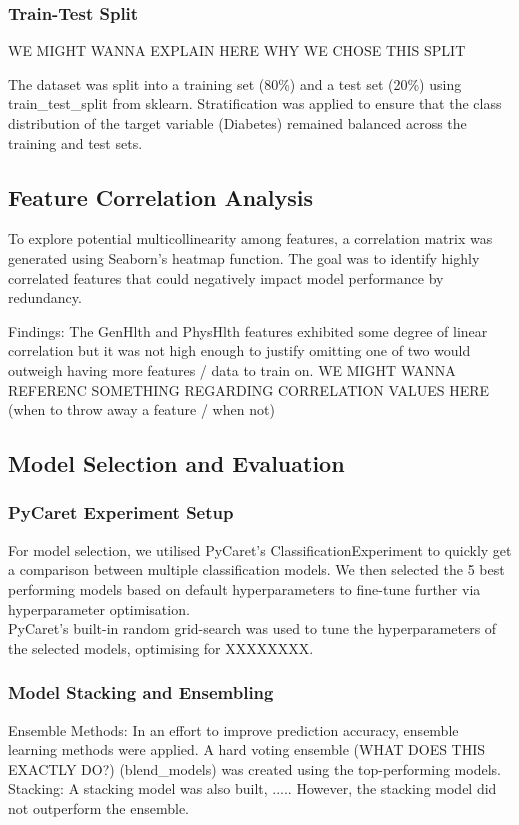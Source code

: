 \documentclass[a4paper,12pt]{article}
\begin{document}
\subsubsection{Train-Test Split}
WE MIGHT WANNA EXPLAIN HERE WHY WE CHOSE THIS SPLIT

The dataset was split into a training set (80\%) and a test set (20\%) using train\_test\_split from 
sklearn. Stratification was applied to ensure that the class distribution of the target variable 
(Diabetes) remained balanced across the training and test sets.

\subsection{Feature Correlation Analysis}
To explore potential multicollinearity among features, a correlation matrix was generated using 
Seaborn's heatmap function. The goal was to identify highly correlated features that could negatively 
impact model performance by redundancy.

Findings: The GenHlth and PhysHlth features exhibited some degree of linear correlation but it was
not high enough to justify omitting one of two would outweigh having more features / data to train 
on.
WE MIGHT WANNA REFERENC SOMETHING REGARDING CORRELATION VALUES HERE 
(when to throw away a feature / when not)

\subsection{Model Selection and Evaluation}
\subsubsection{PyCaret Experiment Setup}
For model selection, we utilised PyCaret's ClassificationExperiment to quickly get a 
comparison between multiple classification models. We then selected the 
5 best performing models based on default hyperparameters to fine-tune further via hyperparameter
optimisation.
\\
PyCaret’s built-in random grid-search was used to tune the hyperparameters of the selected models, 
optimising for XXXXXXXX.

\subsubsection{Model Stacking and Ensembling}
Ensemble Methods: In an effort to improve prediction accuracy, ensemble learning methods were applied. 
A hard voting ensemble (WHAT DOES THIS EXACTLY DO?) (blend\_models) was created using the 
top-performing models.
Stacking: A stacking model was also built, ..... 
However, the stacking model did not outperform the ensemble.
\end{document}

